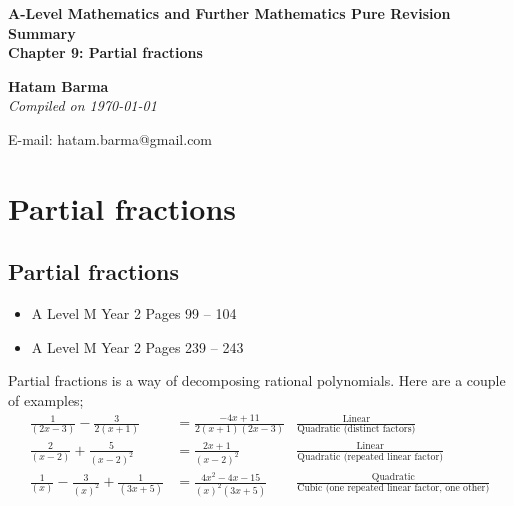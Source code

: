 \documentclass[11pt, a4paper]{article}
\begin{document}
\begin{titlepage}
   \begin{center}
       \vspace*{2.5cm}
	\huge
       \textbf{A-Level Mathematics and Further Mathematics Pure Revision Summary} \\
	\vspace{1cm}
	\Large
       \textbf{Chapter 9: Partial fractions}
            
       \vspace{1.5cm}
	\LARGE
       \textbf{Hatam Barma} \\
	\vspace{0.75cm}
       \normalsize
       \emph{Compiled on \Datea\today} \\

       \vfill
        

	E-mail: hatam.barma@gmail.com
   \end{center}
\end{titlepage}


\tableofcontents

\clearpage
\section{Partial fractions}
\vspace{0.5cm}

\subsection{Partial fractions}
\label{partialfractions1}
\begin{itemize}
\item A Level M Year 2 \hspace{1cm} \phantom{ AS / } Pages 99 -- 104
\item A Level M Year 2 \hspace{1cm} \phantom{ AS / } Pages 239 -- 243
\end{itemize} \par
Partial fractions is a way of decomposing rational polynomials. Here are a couple of examples;
\scriptsize
\begin{align*}
\frac{1}{(2x-3)}-\frac{3}{2(x+1)}&=\frac{-4x+11}{2(x+1)(2x-3)} & \frac{\text{Linear}}{\text{Quadratic (distinct factors)}} \\
\frac{2}{(x-2)}+\frac{5}{(x-2)^{2}}&=\frac{2x+1}{(x-2)^{2}} & \frac{\text{Linear}}{\text{Quadratic (repeated linear factor)}} \\
\frac{1}{(x)}-\frac{3}{(x)^{2}}+\frac{1}{(3x+5)}&=\frac{4x^{2}-4x-15}{(x)^{2}(3x+5)} & \frac{\text{Quadratic}}{\text{Cubic (one repeated linear factor, one other)}}
\end{align*}
\normalsize
\end{document}
